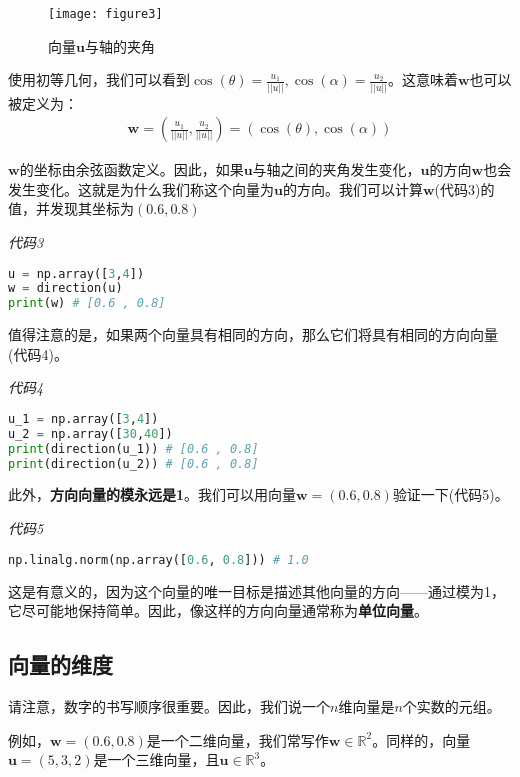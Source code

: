 \begin{figure}[ht]
    \centering
    \texttt{[image: figure3]}
    \caption{向量$\mathbf{u}$与轴的夹角}
    \label{figure3}
\end{figure}


使用初等几何，我们可以看到$\cos(\theta)=\frac{u_1}{||u||}, \cos(\alpha)=\frac{u_2}{||u||}$。这意味着$\mathbf{w}$也可以被定义为：
\begin{gather*}
\mathbf{w} = (\frac{u_1}{||u||},\frac{u_2}{||u||}) = (\cos(\theta),\cos(\alpha))
\end{gather*}

$\mathbf{w}$的坐标由余弦函数定义。因此，如果$\mathbf{u}$与轴之间的夹角发生变化，$\mathbf{u}$的方向$\mathbf{w}$也会发生变化。这就是为什么我们称这个向量为$\mathbf{u}$的方向。我们可以计算$\mathbf{w}$(代码3)的值，并发现其坐标为$(0.6,0.8)$

\emph{代码3}

\begin{lstlisting}[language=python]
u = np.array([3,4]) 
w = direction(u) 
print(w) # [0.6 , 0.8]
\end{lstlisting}

值得注意的是，如果两个向量具有相同的方向，那么它们将具有相同的方向向量(代码4)。

\emph{代码4}

\begin{lstlisting}[language=python]
u_1 = np.array([3,4]) 
u_2 = np.array([30,40]) 
print(direction(u_1)) # [0.6 , 0.8] 
print(direction(u_2)) # [0.6 , 0.8]
\end{lstlisting}

此外，\textbf{方向向量的模永远是1}。我们可以用向量$\mathbf{w}=(0.6,0.8)$验证一下(代码5)。

\emph{代码5}

\begin{lstlisting}[language=python]
np.linalg.norm(np.array([0.6, 0.8])) # 1.0
\end{lstlisting}

这是有意义的，因为这个向量的唯一目标是描述其他向量的方向——通过模为1，它尽可能地保持简单。因此，像这样的方向向量通常称为\textbf{单位向量}。

\subsection{向量的维度}
请注意，数字的书写顺序很重要。因此，我们说一个$n$维向量是$n$个实数的元组。

例如，$\mathbf{w}=(0.6,0.8)$是一个二维向量，我们常写作$\mathbf{w} \in \mathbb{R}^2$。同样的，向量$\mathbf{u}=(5,3,2)$是一个三维向量，且$\mathbf{u} \in \mathbb{R}^3$。

